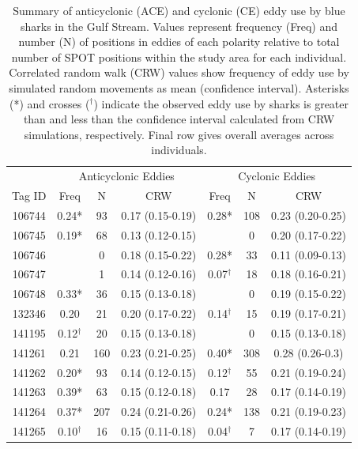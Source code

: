 \clearpage


\begin{table}
\caption[Summary of anticyclonic and cyclonic eddy use by blue sharks in the Gulf Stream]{Summary of anticyclonic (ACE) and cyclonic (CE) eddy use by blue sharks in the Gulf Stream. Values represent frequency (Freq) and number (N) of positions in eddies of each polarity relative to total number of SPOT positions within the study area for each individual. Correlated random walk (CRW) values show frequency of eddy use by simulated random movements as mean (confidence interval). Asterisks (*) and crosses ($^{\dagger}$) indicate the observed eddy use by sharks is greater than and less than the confidence interval calculated from CRW simulations, respectively. Final row gives overall averages across individuals.}
\label{tab:a5t2}
\centering
\begin{tabular}[t]{ccccccc}
\toprule
 & \multicolumn{3}{c}{Anticyclonic Eddies} & \multicolumn{3}{c}{Cyclonic Eddies} \\
Tag ID & Freq & N & CRW & Freq & N & CRW\\
\midrule
106744 & 0.24* & 93 & 0.17 (0.15-0.19) & 0.28* & 108 & 0.23 (0.20-0.25)\\
106745 & 0.19* & 68 & 0.13 (0.12-0.15) &  & 0 & 0.20 (0.17-0.22)\\
106746 &  & 0 & 0.18 (0.15-0.22) & 0.28* & 33 & 0.11 (0.09-0.13)\\
106747 &  & 1 & 0.14 (0.12-0.16) & 0.07$^{\dagger}$ & 18 & 0.18 (0.16-0.21)\\
106748 & 0.33* & 36 & 0.15 (0.13-0.18) &  & 0 & 0.19 (0.15-0.22)\\
132346 & 0.20 & 21 & 0.20 (0.17-0.22) & 0.14$^{\dagger}$ & 15 & 0.19 (0.17-0.21)\\
141195 & 0.12$^{\dagger}$ & 20 & 0.15 (0.13-0.18) &  & 0 & 0.15 (0.13-0.18)\\
141261 & 0.21 & 160 & 0.23 (0.21-0.25) & 0.40* & 308 & 0.28 (0.26-0.3)\\
141262 & 0.20* & 93 & 0.14 (0.12-0.15) & 0.12$^{\dagger}$ & 55 & 0.21 (0.19-0.24)\\
141263 & 0.39* & 63 & 0.15 (0.12-0.18) & 0.17 & 28 & 0.17 (0.14-0.19)\\
141264 & 0.37* & 207 & 0.24 (0.21-0.26) & 0.24* & 138 & 0.21 (0.19-0.23)\\
141265 & 0.10$^{\dagger}$ & 16 & 0.15 (0.11-0.18) & 0.04$^{\dagger}$ & 7 & 0.17 (0.14-0.19)\\

\end{tabular}
\end{table}
